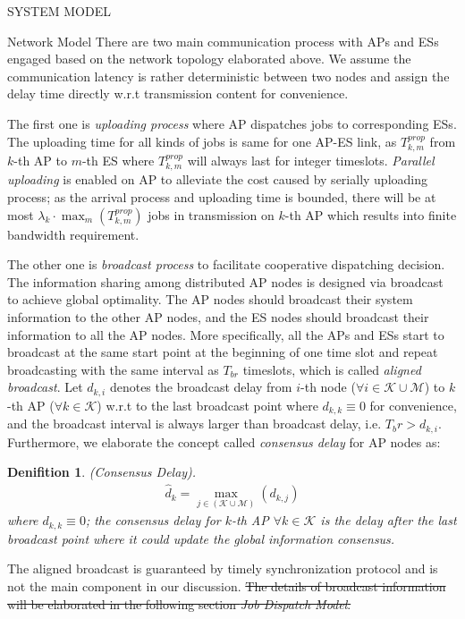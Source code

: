 \documentclass[10pt, conference, letterpaper]{IEEEtran}
\newtheorem{definition}{Denifition}
\newcommand{\apSet}{\mathcal{K}}
\newcommand{\esSet}{\mathcal{M}}
\begin{document}
\begin{section}{SYSTEM MODEL}
\begin{subsection}{Network Model}
            There are two main communication process with APs and ESs engaged based on the network topology elaborated above. We assume the communication latency is rather deterministic between two nodes and assign the delay time directly w.r.t transmission content for convenience.

            The first one is \emph{uploading process} where AP dispatches jobs to corresponding ESs. The uploading time for all kinds of jobs is same for one AP-ES link, as $T^{prop}_{k,m}$ from $k$-th AP to $m$-th ES where $T^{prop}_{k,m}$ will always last for integer timeslots. \emph{Parallel uploading} is enabled on AP to alleviate the cost caused by serially uploading process; as the arrival process and uploading time is bounded, there will be at most $\lambda_k \cdot \max_m(T^{prop}_{k,m})$ jobs in transmission on $k$-th AP which results into finite bandwidth requirement.
            
            The other one is \emph{broadcast process} to facilitate cooperative dispatching decision.
            The information sharing among distributed AP nodes is designed via broadcast to achieve global optimality. The AP nodes should broadcast their system information to the other AP nodes, and the ES nodes should broadcast their information to all the AP nodes. More specifically, all the APs and ESs start to broadcast at the same start point at the beginning of one time slot and repeat broadcasting with the same interval as $T_{br}$ timeslots, which is called \emph{aligned broadcast}. Let $d_{k,i}$ denotes the broadcast delay from $i$-th node ($\forall i \in \apSet\cup\esSet$) to $k$-th AP ($\forall k \in \apSet$) w.r.t to the last broadcast point where $d_{k,k} \equiv 0$ for convenience, and the broadcast interval is always larger than broadcast delay, i.e. $T_br > d_{k,i}$.            
            Furthermore, we elaborate the concept called \emph{consensus delay} for AP nodes as:
            \begin{definition}
                (Consensus Delay).
                \begin{align}
                    \hat{d}_k = \max_{j\in(\apSet\cup\esSet)}(d_{k,j})
                \end{align}
                where $d_{k,k} \equiv 0$; the consensus delay for $k$-th AP $ \forall k \in \apSet$ is the delay after the last broadcast point where it could update the global information consensus.
            \end{definition}
            The aligned broadcast is guaranteed by timely synchronization protocol and is not the main component in our discussion. \st{The details of  broadcast information will be elaborated in the following section \emph{Job Dispatch Model}.}
        \end{subsection}


\end{section}
\end{document}
